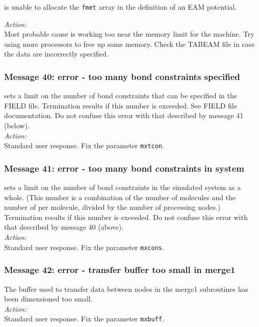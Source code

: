\D{} is unable to allocate the {\tt fmet} array in the definition of an
EAM potential.

\noindent
{\em Action:} \\ 
Most probable cause is working too near the memory limit for the
machine. Try using more processors to free up some memory. Check the
TABEAM file in case the data are incorrectly specified.

\subsubsection*{Message 40: error - too many bond constraints specified}

\D{} sets a limit on the number of bond constraints  that can be
specified in the FIELD file. Termination results if this number is
exceeded. See FIELD file documentation. Do not confuse this error with
that described by message 41 (below). \\ 

\noindent
{\em Action:} \\ 
Standard user response. Fix the parameter {\tt mxtcon}.

\subsubsection*{Message 41: error - too many bond constraints in system}

\D{} sets a limit on the number of bond constraints  in the
simulated system as a whole. (This number is a combination of the
number of molecules and the number of per molecule,
divided by the number of processing nodes.) Termination results if
this number is exceeded. 
Do not confuse
this error with that described by message 40 (above). \\ 

\noindent
{\em Action:} \\ 
Standard user response. Fix the parameter {\tt mxcons}.

\subsubsection*{Message 42: error - transfer buffer too small in merge1}

The buffer used to transfer data between nodes in the {\sc merge1}
subroutines has been dimensioned too small.\\

\noindent
{\em Action:}\\ Standard user response. Fix the parameter {\tt mxbuff}.


